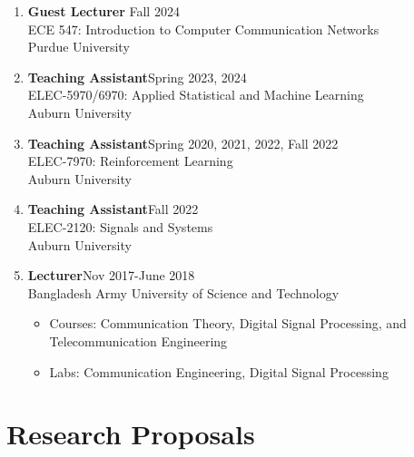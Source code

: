 \documentclass[letterpaper,11pt]{article}
\begin{document}
\begin{enumerate}[label=\arabic*., leftmargin=*, topsep=2pt, itemsep=-4pt]
    \item {\bf Guest Lecturer} \hfill Fall 2024\\
    ECE 547: Introduction to Computer Communication Networks \\
    Purdue University 
    \item {\bf Teaching Assistant}\hfill Spring 2023, 2024\\
     {ELEC-5970/6970: Applied Statistical and Machine Learning}\\
     Auburn University
     \item {\bf Teaching Assistant}\hfill Spring 2020, 2021, 2022, Fall 2022\\
     {ELEC-7970: Reinforcement Learning}\\
     Auburn University
       \item {\bf Teaching Assistant}\hfill Fall 2022\\
     {ELEC-2120: Signals and Systems}\\
     Auburn University\\
       \item {\bf Lecturer}\hfill Nov 2017-June 2018\\
      {Bangladesh Army University of Science and Technology} 
\begin{itemize}[leftmargin=*, topsep=0pt, itemsep=-2pt]
    \item Courses: Communication Theory, Digital Signal Processing, and Telecommunication Engineering
    \item Labs: Communication Engineering, Digital Signal Processing
\end{itemize}
\end{enumerate}


\section{Research Proposals}
\end{document}
